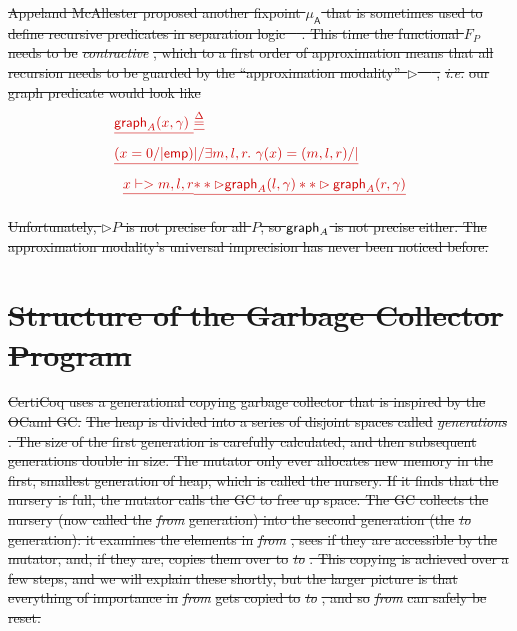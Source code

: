 \documentclass[acmsmall,screen]{acmart}  %
\newcommand\hide[1]{}
\newcommand{\p}[1]{\ensuremath{\mathsf{#1}}} \newcommand{\m}[1]{\ensuremath{\mathit{#1}}} \newcommand{\ma}[1]{\ensuremath{\mathcal{#1}}} \let\ramify\lightning
\providecommand{\DIFdel}[1]{{\protect\color{red}\sout{#1}}}                      %
\begin{document}
\DIFdel{Appeland McAllester proposed another fixpoint $\mu_{\mathsf{A}}$
that is sometimes used to define recursive predicates in separation
logic \mbox{%
\cite{appel:fixpoint}}\hspace{0pt}%
.  This time the functional $F_P$ needs to be
}\emph{\DIFdel{contractive}}%
\DIFdel{, which to a first order of approximation means that
all recursion needs to be guarded by the ``approximation
modality''~$\rhd$~\mbox{%
\cite{appel:vmm}}\hspace{0pt}%
, }\emph{\DIFdel{i.e.}} %
\DIFdel{our graph predicate would
look like
}\begin{eqnarray*}
\DIFdel{\grapham(x, \gamma) ~ }&\DIFdel{\stackrel{\Delta}{=}}\\
 \DIFdel{(x = 0 /| \p{emp}) }& \DIFdel{|/ \exists m,l,r.~ \gamma(x)=(m,l,r) /| \null }\\
 \DIFdel{x |-> m,l,r }& \DIFdel{** \rhd \grapham(l, \gamma) ** \rhd \grapham(r, \gamma)
}\end{eqnarray*}

\DIFdel{Unfortunately, $\rhd P$ is not precise for all $P$, so $\grapham$ is not precise either.  The approximation modality's universal imprecision has never been noticed before.
}%

\section{\texorpdfstring{\DIFdel{Structure of the Garbage Collector Program}}{XXX}}
\addtocounter{section}{-1}%

\DIFdel{CertiCoq uses a generational copying garbage collector 
that is inspired by the OCaml GC. 
}%
\DIFdel{The heap is divided into a series of disjoint
spaces called }\emph{\DIFdel{generations}}%
\DIFdel{. The size of the first generation
is carefully calculated, and 
then subsequent generations
double in size.
The mutator only ever allocates new memory in the first, 
smallest generation of heap, which is called the nursery. 
If it finds that the nursery is full, 
the mutator calls the GC to free up space.
The GC collects the nursery 
(now called the }\emph{\DIFdel{from}} %
\DIFdel{generation) into the second generation (the }\emph{\DIFdel{to}} %
\DIFdel{generation): 
it examines the elements 
in }\emph{\DIFdel{from}}%
\DIFdel{, sees if they are accessible by
the mutator, and, if they are, 
copies them over to }\emph{\DIFdel{to}}%
\DIFdel{. This copying is achieved over a few steps, 
and we will explain these shortly, but the larger picture is that 
everything of importance in }\emph{\DIFdel{from}} %
\DIFdel{gets copied to }\emph{\DIFdel{to}}%
\DIFdel{, 
and so }\emph{\DIFdel{from}} %
\DIFdel{can safely be reset. 
}%
\end{document}
